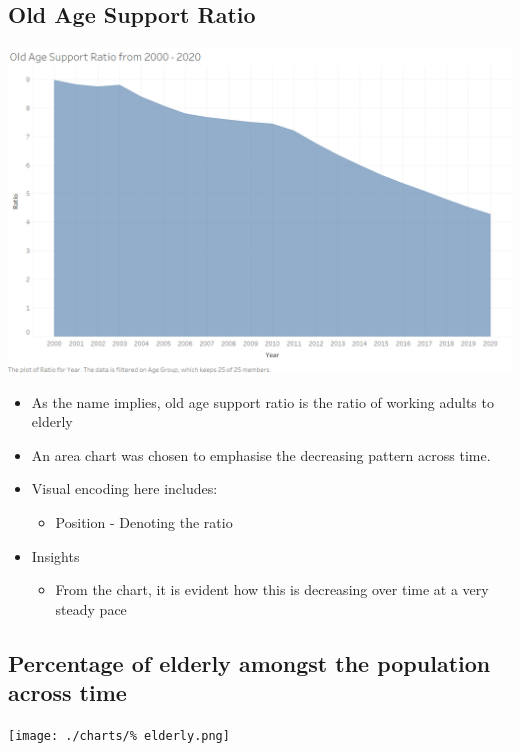 \documentclass[a4paper, 11pt]{article}
\begin{document}
\subsection{Old Age Support Ratio}
\label{sec:org98c4f7d}

\begin{center}
\includegraphics[width=.9\linewidth]{./charts/old age support ratio.png}
\end{center}

\begin{itemize}
\item As the name implies, old age support ratio is the ratio of working adults to elderly
\item An area chart was chosen to emphasise the decreasing pattern across time.
\item Visual encoding here includes:
\begin{itemize}
\item Position - Denoting the ratio
\end{itemize}
\item Insights
\begin{itemize}
\item From the chart, it is evident how this is decreasing over time at a very steady pace
\end{itemize}
\end{itemize}
\subsection{Percentage of elderly amongst the population across time}
\label{sec:orgc4363db}

\begin{center}
\texttt{[image: ./charts/\% elderly.png]}
\end{center}
\end{document}
